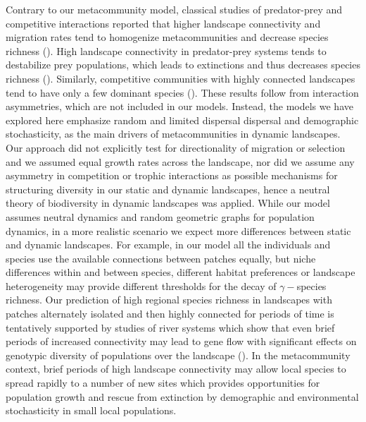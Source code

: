 \documentclass[12pt]{article}
\begin{document}
Contrary to our metacommunity model, classical studies of predator-prey and competitive interactions reported that higher landscape connectivity and migration rates tend to homogenize metacommunities and decrease species richness (\cite{ellneretal2001, foxetal2011}). High landscape connectivity in predator-prey systems tends to destabilize prey populations, which leads to extinctions and thus decreases species richness (\cite{ellneretal2001, foxetal2011}). Similarly, competitive communities with highly connected landscapes tend to have only a few dominant species (\cite{Holyoaketal2005}). These results follow from interaction asymmetries, which are not included in our models. Instead, the models we have explored here emphasize random and limited dispersal dispersal and demographic stochasticity, as the main drivers of metacommunities in dynamic landscapes. Our approach did not explicitly test for directionality of migration or selection and we assumed equal growth rates across the landscape, nor did we assume any asymmetry in competition or trophic interactions as possible mechanisms for structuring diversity in our static and dynamic landscapes, hence a neutral theory of biodiversity in dynamic landscapes was applied. While our model assumes neutral dynamics and random geometric graphs for population dynamics, in a more realistic scenario we expect more differences between static and dynamic landscapes. For example, in our model all the individuals and species use the available connections between patches equally, but niche differences within and between species, different habitat preferences or landscape heterogeneity may provide different thresholds for the decay of $\gamma-$species richness. Our prediction of high regional species richness in landscapes with patches alternately isolated and then highly connected for periods of time is tentatively supported by studies of river systems which show that even brief periods of increased connectivity may lead to gene flow with significant effects on genotypic diversity of populations over the landscape (\cite{BoizardEtAl2009}). In the metacommunity context, brief periods of high landscape connectivity may allow local species to spread rapidly to a number of new sites which provides opportunities for population growth and rescue from extinction by demographic and environmental stochasticity in small local populations. 
\end{document}
